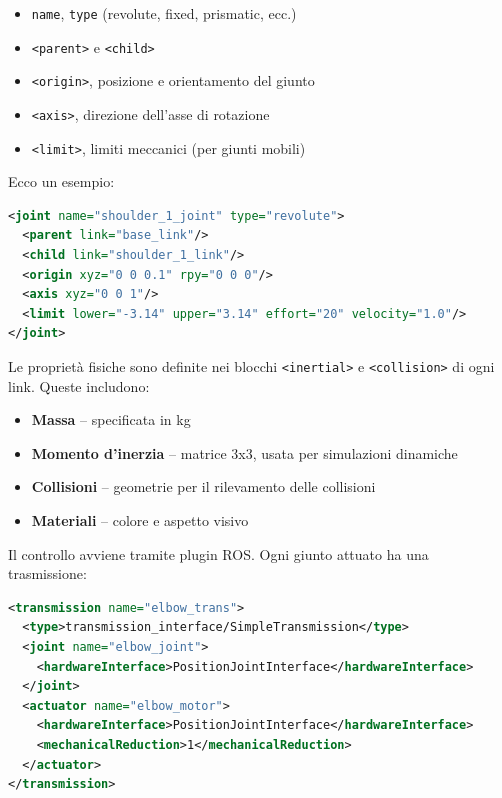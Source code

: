 \documentclass[11pt]{report}
\begin{document}
\begin{itemize}
    \item \texttt{name}, \texttt{type} (revolute, fixed, prismatic, ecc.)
    \item \texttt{<parent>} e \texttt{<child>}
    \item \texttt{<origin>}, posizione e orientamento del giunto
    \item \texttt{<axis>}, direzione dell’asse di rotazione
    \item \texttt{<limit>}, limiti meccanici (per giunti mobili)
\end{itemize}

Ecco un esempio:

\begin{lstlisting}[language=xml]
<joint name="shoulder_1_joint" type="revolute">
  <parent link="base_link"/>
  <child link="shoulder_1_link"/>
  <origin xyz="0 0 0.1" rpy="0 0 0"/>
  <axis xyz="0 0 1"/>
  <limit lower="-3.14" upper="3.14" effort="20" velocity="1.0"/>
</joint>
\end{lstlisting}
\vspace{1em}
Le proprietà fisiche sono definite nei blocchi \texttt{<inertial>} e \texttt{<collision>} di ogni link. Queste includono:

\begin{itemize}
    \item \textbf{Massa} – specificata in kg
    \item \textbf{Momento d’inerzia} – matrice 3x3, usata per simulazioni dinamiche
    \item \textbf{Collisioni} – geometrie per il rilevamento delle collisioni
    \item \textbf{Materiali} – colore e aspetto visivo
\end{itemize}
\vspace{1em}
Il controllo avviene tramite plugin ROS. Ogni giunto attuato ha una trasmissione:

\begin{lstlisting}[language=xml]
<transmission name="elbow_trans">
  <type>transmission_interface/SimpleTransmission</type>
  <joint name="elbow_joint">
    <hardwareInterface>PositionJointInterface</hardwareInterface>
  </joint>
  <actuator name="elbow_motor">
    <hardwareInterface>PositionJointInterface</hardwareInterface>
    <mechanicalReduction>1</mechanicalReduction>
  </actuator>
</transmission>
\end{lstlisting}
\vspace{1em}
\end{document}
